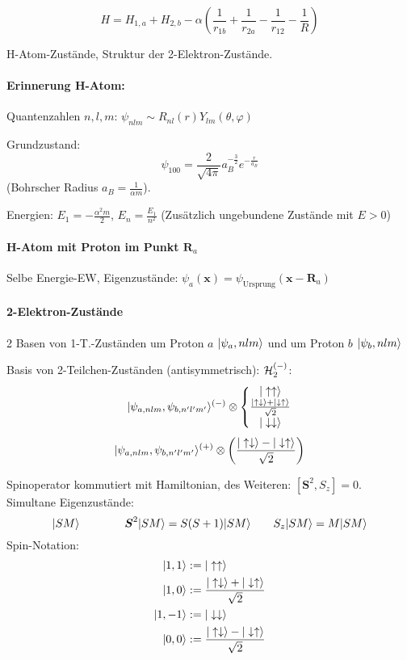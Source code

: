 \documentclass[11pt,a4paper]{report}
\renewcommand{\vec}{\boldsymbol}
\begin{document}
$$H=H_{1,a}+H_{2,b}-\alpha\left(\frac{1}{r_{1b}}+\frac{1}{r_{2a}}-\frac{1}{r_{12}}-\frac{1}{R}\right)$$

H-Atom-Zustände, Struktur der 2-Elektron-Zustände.\par 

\paragraph{Erinnerung H-Atom:}\mbox{}\par 
Quantenzahlen $n, l, m$: $\psi_{nlm}\sim R_{nl}(r)Y_{lm}(\theta ,\varphi )$\par 
Grundzustand:
$$\psi_{100}=\frac{2}{\sqrt{4\pi}}a_B^{-\frac{3}{2}}e^{-\frac{r}{a_B}}$$
(Bohrscher Radius $a_B=\frac{1}{\alpha m}$).\par 
Energien: $E_1 = -\frac{\alpha^2 m}{2}$, $E_n = \frac{E_1}{n^2}$ (Zusätzlich ungebundene Zustände mit $E>0$)\par 

\paragraph{H-Atom mit Proton im Punkt $\vec{R}_a$}\mbox{}\par 

Selbe Energie-EW, Eigenzustände: $\psi_a(\vec{x})=\psi_{\mathrm{Ursprung}}(\vec{x}-\vec{R}_a)$

\paragraph{2-Elektron-Zustände} 2 Basen von 1-T.-Zuständen um Proton $a$ $|\psi_a,nlm\rangle$ und um Proton $b$ $|\psi_b,nlm\rangle$\par 

Basis von 2-Teilchen-Zuständen (antisymmetrisch): $\mathcal{H}_2^{(-)}$:
$$|\psi_{a,nlm},\psi_{b,n'l'm'}\rangle^{(-)}\otimes\left\{\begin{matrix}
|\uparrow\uparrow\rangle \\ \frac{|\uparrow\downarrow\rangle+|\downarrow\uparrow\rangle}{\sqrt{2}} \\ |\downarrow\downarrow\rangle
\end{matrix}\right.$$
$$|\psi_{a,nlm},\psi_{b,n'l'm'}\rangle^{(+)}\otimes \left(\frac{|\uparrow\downarrow\rangle-|\downarrow\uparrow\rangle}{\sqrt{2}}\right)$$

Spinoperator kommutiert mit Hamiltonian, des Weiteren: $[\vec{S}^2,S_z]=0$. Simultane Eigenzustände:
$$\ket{SM}\qquad \qquad \vec{S}^2\ket{SM}=S(S+1)\ket{SM}\qquad S_z\ket{SM}=M\ket{SM}$$
Spin-Notation:
\begin{align*}
|1,1\rangle&:=|\uparrow\uparrow\rangle\\
|1,0\rangle&:=\frac{|\uparrow\downarrow\rangle+|\downarrow\uparrow\rangle}{\sqrt{2}}\\
|1, -1\rangle&:=|\downarrow\downarrow\rangle \\
|0, 0\rangle&:= \frac{|\uparrow\downarrow\rangle-|\downarrow\uparrow\rangle}{\sqrt{2}}
\end{align*}
\end{document}
